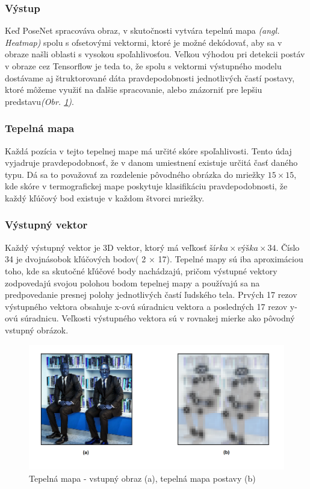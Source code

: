 \documentclass[slovak,master,dept460,male,cpp,cpdeclaration]{diploma}
\begin{document}
\subsubsection{Výstup}
Keď PoseNet spracováva obraz, v skutočnosti vytvára tepelnú mapa \textit{(angl. Heatmap)} spolu s ofsetovými vektormi, ktoré je možné dekódovať, aby sa v obraze našli oblasti s vysokou spoľahlivosťou. Veľkou výhodou pri detekcii postáv v obraze cez Tensorflow je teda to, že spolu s vektormi výstupného modelu dostávame aj štruktorované dáta pravdepodobnosti jednotlivých častí postavy, ktoré môžeme využiť na ďalšie spracovanie, alebo znázorniť pre lepšiu predstavu\textit{(Obr. \ref{fig:tfPoseHeatmap})}.

\subsubsection{Tepelná mapa}
Každá pozícia v tejto tepelnej mape má určité skóre spoľahlivosti. Tento údaj vyjadruje pravdepodobnosť, že v danom umiestnení existuje určitá časť daného typu. Dá sa to považovať za rozdelenie pôvodného obrázka do mriežky \textit{$15\times 15$}, kde skóre v termografickej mape poskytuje klasifikáciu pravdepodobnosti, že každý kľúčový bod existuje v každom štvorci mriežky.

\subsubsection{Výstupný vektor}
Každý výstupný vektor je 3D vektor, ktorý má veľkosť \textit{$šírka  \times výška \times 34$}. Číslo 34 je dvojnásobok kľúčových bodov( 2 $\times$ 17). Tepelné mapy sú iba aproximáciou toho, kde sa skutočné kľúčové body nachádzajú, pričom výstupné vektory zodpovedajú svojou polohou bodom tepelnej mapy a používajú sa na predpovedanie presnej polohy jednotlivých častí ľudského tela. Prvých 17 rezov výstupného vektora obsahuje x-ovú súradnicu vektora a posledných 17 rezov y-ovú súradnicu. Veľkosti výstupného vektora sú v rovnakej mierke ako pôvodný vstupný obrázok.

\begin{figure}[H]
	\centering
	\includegraphics[width=1\textwidth]{Figures/tfPose1.png}
	\caption{Tepelná mapa  - vstupný obraz (a), tepelná mapa postavy (b)}
	\label{fig:tfPoseHeatmap}
\end{figure}
\end{document}
